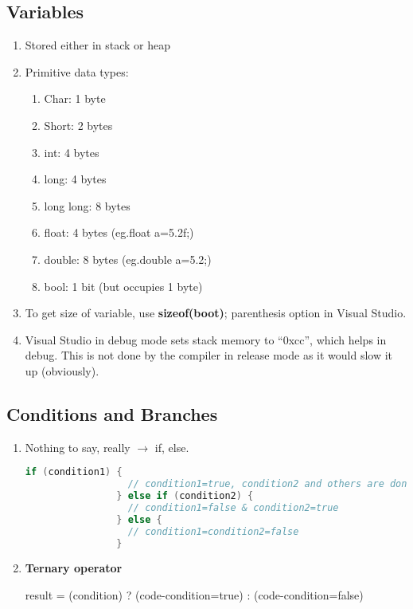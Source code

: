 \documentclass{article}
\begin{document}
    \subsection{Variables}
        \begin{enumerate}
        \item Stored either in stack or heap
        \item Primitive data types:
        \begin{enumerate}
            \item Char: 1 byte
            \item Short: 2 bytes
            \item int: 4 bytes
            \item long: 4 bytes
            \item long long: 8 bytes
            \item float: 4 bytes (eg.float a=5.2f;)
            \item double: 8 bytes (eg.double a=5.2;) 
            \item bool: 1 bit (but occupies 1 byte)
        \end{enumerate}
        \item To get size of variable, use \textbf{sizeof(boot)}; parenthesis option in Visual Studio.
        \item Visual Studio in debug mode sets stack memory to “0xcc”, which helps in debug. This is not done by the compiler in release mode as it would slow it up (obviously).
    
        \end{enumerate}
        
    \subsection{Conditions and Branches}
        \begin{enumerate}
            \item Nothing to say, really $\rightarrow$ if, else.
            
            \begin{lstlisting}[language=C++, caption=If...else if...else example]
                if (condition1) {
                  // condition1=true, condition2 and others are don't care
                } else if (condition2) {
                  // condition1=false & condition2=true
                } else {
                  // condition1=condition2=false
                }
            \end{lstlisting}
            
            \item \textbf{Ternary operator}
            
            result = (condition) ? (code-condition=true) : (code-condition=false)
            
            
        \end{enumerate}
        
\end{document}
